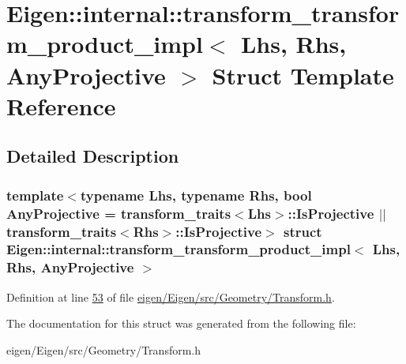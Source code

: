 \hypertarget{struct_eigen_1_1internal_1_1transform__transform__product__impl}{}\section{Eigen\+:\+:internal\+:\+:transform\+\_\+transform\+\_\+product\+\_\+impl$<$ Lhs, Rhs, Any\+Projective $>$ Struct Template Reference}
\label{struct_eigen_1_1internal_1_1transform__transform__product__impl}


\subsection{Detailed Description}
\subsubsection*{template$<$typename Lhs, typename Rhs, bool Any\+Projective = transform\+\_\+traits$<$\+Lhs$>$\+::\+Is\+Projective $\vert$$\vert$ transform\+\_\+traits$<$\+Rhs$>$\+::\+Is\+Projective$>$\newline
struct Eigen\+::internal\+::transform\+\_\+transform\+\_\+product\+\_\+impl$<$ Lhs, Rhs, Any\+Projective $>$}



Definition at line \hyperlink{eigen_2_eigen_2src_2_geometry_2_transform_8h_source_l00053}{53} of file \hyperlink{eigen_2_eigen_2src_2_geometry_2_transform_8h_source}{eigen/\+Eigen/src/\+Geometry/\+Transform.\+h}.



The documentation for this struct was generated from the following file\+:\begin{DoxyCompactItemize}
\item 
eigen/\+Eigen/src/\+Geometry/\+Transform.\+h\end{DoxyCompactItemize}
